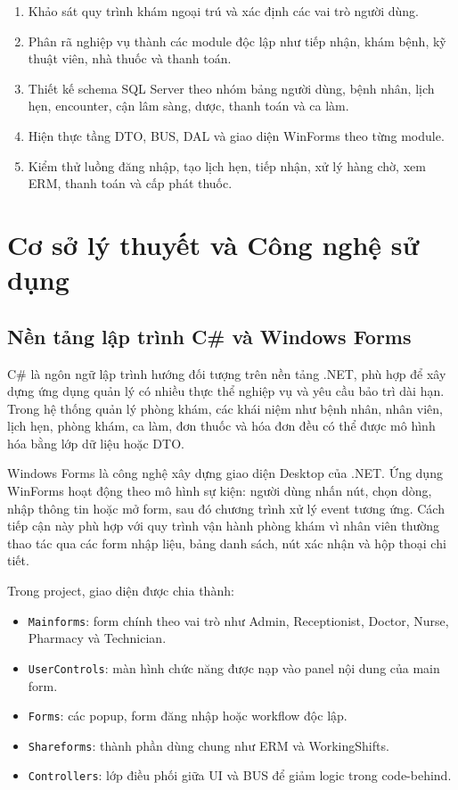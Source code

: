 \documentclass[12pt,a4paper]{article}
\numberwithin{figure}{subsection}
\numberwithin{table}{subsection}
\begin{document}
\begin{enumerate}
    \item Khảo sát quy trình khám ngoại trú và xác định các vai trò người dùng.
    \item Phân rã nghiệp vụ thành các module độc lập như tiếp nhận, khám bệnh, kỹ thuật viên, nhà thuốc và thanh toán.
    \item Thiết kế schema SQL Server theo nhóm bảng người dùng, bệnh nhân, lịch hẹn, encounter, cận lâm sàng, dược, thanh toán và ca làm.
    \item Hiện thực tầng DTO, BUS, DAL và giao diện WinForms theo từng module.
    \item Kiểm thử luồng đăng nhập, tạo lịch hẹn, tiếp nhận, xử lý hàng chờ, xem ERM, thanh toán và cấp phát thuốc.
\end{enumerate}

\section{Cơ sở lý thuyết và Công nghệ sử dụng}

\subsection{Nền tảng lập trình C\# và Windows Forms}

C\# là ngôn ngữ lập trình hướng đối tượng trên nền tảng .NET, phù hợp để xây dựng ứng dụng quản lý có nhiều thực thể nghiệp vụ và yêu cầu bảo trì dài hạn. Trong hệ thống quản lý phòng khám, các khái niệm như bệnh nhân, nhân viên, lịch hẹn, phòng khám, ca làm, đơn thuốc và hóa đơn đều có thể được mô hình hóa bằng lớp dữ liệu hoặc DTO.

Windows Forms là công nghệ xây dựng giao diện Desktop của .NET. Ứng dụng WinForms hoạt động theo mô hình sự kiện: người dùng nhấn nút, chọn dòng, nhập thông tin hoặc mở form, sau đó chương trình xử lý event tương ứng. Cách tiếp cận này phù hợp với quy trình vận hành phòng khám vì nhân viên thường thao tác qua các form nhập liệu, bảng danh sách, nút xác nhận và hộp thoại chi tiết.

Trong project, giao diện được chia thành:

\begin{itemize}
    \item \texttt{Mainforms}: form chính theo vai trò như Admin, Receptionist, Doctor, Nurse, Pharmacy và Technician.
    \item \texttt{UserControls}: màn hình chức năng được nạp vào panel nội dung của main form.
    \item \texttt{Forms}: các popup, form đăng nhập hoặc workflow độc lập.
    \item \texttt{Shareforms}: thành phần dùng chung như ERM và WorkingShifts.
    \item \texttt{Controllers}: lớp điều phối giữa UI và BUS để giảm logic trong code-behind.
\end{itemize}
\end{document}
